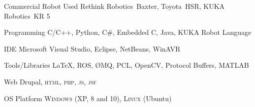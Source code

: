 

\begin{cvskills}

  \cvskill
    {Commercial Robot Used} %
    {Rethink Robotics\textcopyright~Baxter, Toyota\textcopyright~HSR, KUKA Robotics\textcopyright~KR 5} %

  \cvskill
    {Programming} %
    {C/C++, Python, C\#, Embedded C, Java, KUKA Robot Language} %

  \cvskill
    {IDE} %
    {Microsoft Visual Studio, Eclipse, NetBeans, WinAVR} %

  \cvskill
    {Tools/Libraries} %
    {\LaTeX, ROS, \O{}MQ, PCL, OpenCV, Protocol Buffers, MATLAB} %

  \cvskill
    {Web} %
    {Drupal, \textsc{html}, \textsc{php}, \textsc{js}, \textsc{jsf}} %

  \cvskill
    {OS Platform} %
    {\textsc{Windows} (XP, 8 and 10), \textsc{Linux} (Ubuntu)} %

\end{cvskills}
